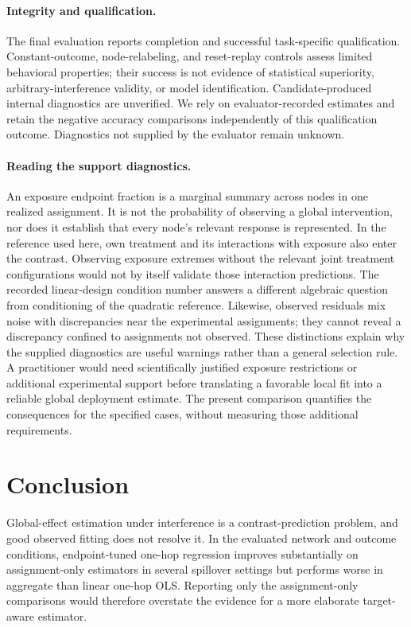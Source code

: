 \documentclass{article}
\begin{document}
\paragraph{Integrity and qualification.}
The final evaluation reports completion and successful task-specific qualification. Constant-outcome, node-relabeling, and reset-replay controls assess limited behavioral properties; their success is not evidence of statistical superiority, arbitrary-interference validity, or model identification. Candidate-produced internal diagnostics are unverified. We rely on evaluator-recorded estimates and retain the negative accuracy comparisons independently of this qualification outcome. Diagnostics not supplied by the evaluator remain unknown.

\paragraph{Reading the support diagnostics.}
An exposure endpoint fraction is a marginal summary across nodes in one realized assignment. It is not the probability of observing a global intervention, nor does it establish that every node's relevant response is represented. In the reference used here, own treatment and its interactions with exposure also enter the contrast. Observing exposure extremes without the relevant joint treatment configurations would not by itself validate those interaction predictions. The recorded linear-design condition number answers a different algebraic question from conditioning of the quadratic reference. Likewise, observed residuals mix noise with discrepancies near the experimental assignments; they cannot reveal a discrepancy confined to assignments not observed. These distinctions explain why the supplied diagnostics are useful warnings rather than a general selection rule. A practitioner would need scientifically justified exposure restrictions or additional experimental support before translating a favorable local fit into a reliable global deployment estimate. The present comparison quantifies the consequences for the specified cases, without measuring those additional requirements.

\section{Conclusion}
Global-effect estimation under interference is a contrast-prediction problem, and good observed fitting does not resolve it. In the evaluated network and outcome conditions, endpoint-tuned one-hop regression improves substantially on assignment-only estimators in several spillover settings but performs worse in aggregate than linear one-hop OLS. Reporting only the assignment-only comparisons would therefore overstate the evidence for a more elaborate target-aware estimator.
\end{document}

